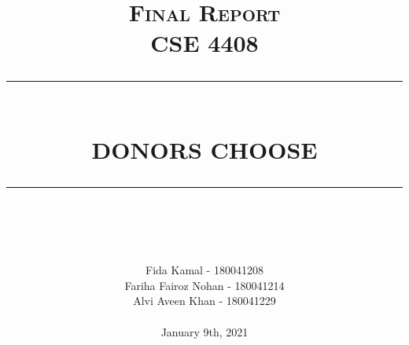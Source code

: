 \documentclass[12pt]{report}
\newcommand{\HRule}[1]{\rule{\linewidth}{#1}}
\begin{document}
\title{ \normalsize \textsc{Final Report\\CSE 4408}
		\\ [2.0cm]
		\HRule{2pt} \\
		\LARGE \textbf{\uppercase{DONORS CHOOSE}}
		\HRule{2pt} \\ [0.5cm]
		\normalsize  \vspace*{5\baselineskip}}

\date{}

\author{
		Fida Kamal - 180041208\\
        Fariha Fairoz Nohan - 180041214\\
        Alvi Aveen Khan - 180041229\\
        \\
        January 9th, 2021\\ }

\maketitle
\end{document}
